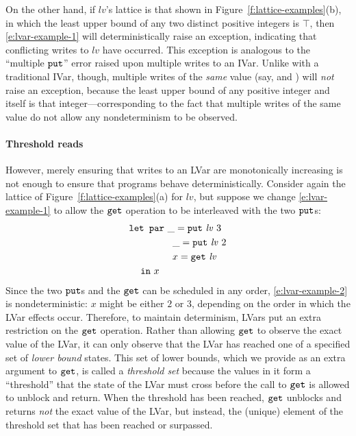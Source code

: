 On the other hand, if $\mathit{lv}$'s lattice is that shown in
Figure~\ref{f:lattice-examples}(b), in which the least upper bound of
any two distinct positive integers is $\top$, then
\ref{e:lvar-example-1} will deterministically raise an exception,
indicating that conflicting writes to $\mathit{lv}$ have occurred.
This exception is analogous to the ``multiple $\mbox{\texttt{put}}$'' error raised
upon multiple writes to an IVar.  Unlike with a traditional IVar,
though, multiple writes of the \emph{same} value (say,
 and ) will \emph{not}
raise an exception, because the least upper bound of any positive
integer and itself is that integer---corresponding to the fact that
multiple writes of the same value do not allow any nondeterminism to
be observed.

\paragraph{Threshold reads}

However, merely ensuring that writes to an LVar are monotonically
increasing is not enough to ensure that programs behave deterministically.
Consider again the lattice of Figure~\ref{f:lattice-examples}(a) for
$\mathit{lv}$, but suppose we change \ref{e:lvar-example-1} to allow
the $\mbox{\texttt{get}}$ operation to be interleaved with the two $\mbox{\texttt{put}}$s:
\begin{equation}
\begin{split}
& \mbox{\texttt{\mbox{\texttt{let}}~\mbox{\texttt{par}}}} ~\_ = \mbox{\texttt{put}}~\mathit{lv}~3 \\
&  \hspace{4.2em} ~\_ = \mbox{\texttt{put}}~\mathit{lv}~2 \\
&  \hspace{4.2em} ~x = \mbox{\texttt{get}}~\mathit{lv} \\
&  \hspace{1.2em} \mbox{\texttt{in}}~x
\end{split}
\label{e:lvar-example-2}
\end{equation}
Since the two $\mbox{\texttt{put}}$s and the $\mbox{\texttt{get}}$ can be scheduled in any order, 
\ref{e:lvar-example-2} is nondeterministic: $x$ might be either $2$ or $3$,
depending on the order in which the LVar effects occur.  Therefore,
to maintain determinism, LVars put an extra restriction on the $\mbox{\texttt{get}}$
operation.  Rather than allowing $\mbox{\texttt{get}}$ to observe the exact value of the LVar,
it can only observe that the LVar has reached one of a specified
set of \emph{lower bound} states.  This set of lower bounds, which we provide as
an extra argument to $\mbox{\texttt{get}}$, is called a \emph{threshold set} because the values
in it form a ``threshold'' that the state of the LVar must cross before the call
to $\mbox{\texttt{get}}$ is allowed to unblock and return.  When the threshold has been
reached, $\mbox{\texttt{get}}$ unblocks and returns \emph{not} the exact value of the LVar, but
instead, the (unique) element of the threshold set that has been reached or
surpassed.

